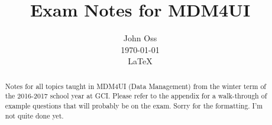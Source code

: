 \documentclass[final,1p,12pt]{elsarticle}
\begin{document}
\begin{frontmatter}
    \title{Exam Notes for MDM4UI}
    \author{John Oss\\
            \today\\
            \LaTeX}
    \begin{abstract}
        Notes for all topics taught in MDM4UI (Data Management) from the winter term of the 2016-2017 school year at GCI.  
        Please refer to the appendix for a walk-through of example questions that will probably be on the exam. 
        Sorry for the formatting. I'm not quite done yet.
    \end{abstract}
\end{frontmatter}












    



\end{document}

